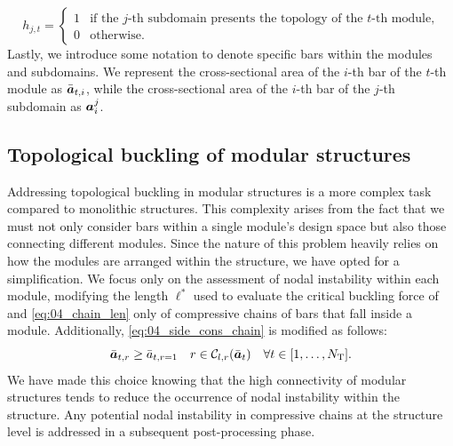 \begin{equation}
    h_{j,t} =
    \begin{cases}
      1 & \text{if the $j$-th subdomain presents the topology of the $t$-th module,} \\
      0 & \text{otherwise.} 
    \end{cases}
\end{equation}
Lastly, we introduce some notation to denote specific bars within the modules and subdomains. We represent the cross-sectional area of the $i$-th bar of the $t$-th module as $\bar{\bm{a}}_{t,i}$, while the cross-sectional area of the $i$-th bar of the $j$-th subdomain as $\bm{a}^j_i$.
\subsection{Topological buckling of modular structures}
Addressing topological buckling in modular structures is a more complex task compared to monolithic structures. This complexity arises from the fact that we must not only consider bars within a single module's design space but also those connecting different modules. Since the nature of this problem heavily relies on how the modules are arranged within the structure, we have opted for a simplification.  We focus only on the assessment of nodal instability within each module, modifying the length $\ell^*$ used to evaluate the critical buckling force of  and \eqref{eq:04_chain_len} only of compressive chains of bars that fall inside a module. Additionally, \eqref{eq:04_side_cons_chain} is modified as follows:
\begin{equation}\label{eq:05_side_cons_chain_modular}
    \bar{\bm{a}}_{t,r} \geq \bar{a}_{t,r=1} \quad r \in \mathcal{C}_{l,r}(\bar{\bm{a}}_t) \quad \forall t \in [1,\dots,N_\text{T}].
\end{equation}
We have made this choice knowing that the high connectivity of modular structures tends to reduce the occurrence of nodal instability within the structure. Any potential nodal instability in compressive chains at the structure level is addressed in a subsequent post-processing phase.

